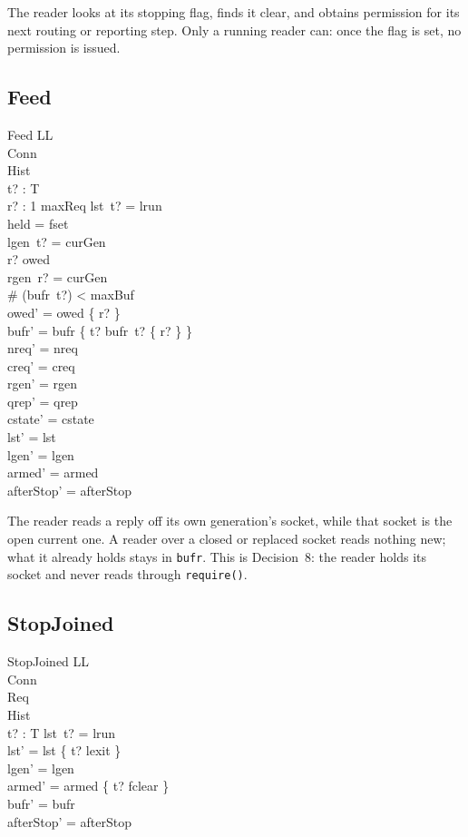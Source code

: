 \documentclass[a4paper,10pt,fleqn]{article}
\begin{document}
The reader looks at its stopping flag, finds it clear, and obtains permission for its next routing or reporting step.  Only a running reader can: once the flag is set, no permission is issued.

\subsection{Feed}

\begin{schema}{Feed}
  \Delta LL \\
  \Xi Conn \\
  \Xi Hist \\
  t? : T \\
  r? : 1 \upto maxReq
\where
  lst~t? = lrun \\
  held = fset \\
  lgen~t? = curGen \\
  r? \in owed \\
  rgen~r? = curGen \\
  \# (bufr~t?) < maxBuf \\
  owed' = owed \setminus \{ r? \} \\
  bufr' = bufr \oplus \{ t? \mapsto bufr~t? \cup \{ r? \} \} \\
  nreq' = nreq \\
  creq' = creq \\
  rgen' = rgen \\
  qrep' = qrep \\
  cstate' = cstate \\
  lst' = lst \\
  lgen' = lgen \\
  armed' = armed \\
  afterStop' = afterStop
\end{schema}

The reader reads a reply off its own generation's socket, while that socket is the open current one.  A reader over a closed or replaced socket reads nothing new; what it already holds stays in \texttt{bufr}. This is Decision~8: the reader holds its socket and never reads through \texttt{require()}.

\subsection{StopJoined}

\begin{schema}{StopJoined}
  \Delta LL \\
  \Xi Conn \\
  \Xi Req \\
  \Xi Hist \\
  t? : T
\where
  lst~t? = lrun \\
  lst' = lst \oplus \{ t? \mapsto lexit \} \\
  lgen' = lgen \\
  armed' = armed \oplus \{ t? \mapsto fclear \} \\
  bufr' = bufr \\
  afterStop' = afterStop
\end{schema}
\end{document}
